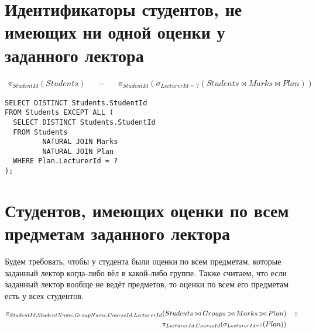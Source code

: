 \documentclass{article}
\def\ojoin{\setbox0=\hbox{$\bowtie$}%
  \rule[-.02ex]{.25em}{.4pt}\llap{\rule[\ht0]{.25em}{.4pt}}}
\def\leftouterjoin{\mathbin{\ojoin\mkern-5.8mu\bowtie}}
\begin{document}
	\section{Идентификаторы студентов, не имеющих ни одной оценки у заданного лектора}
	
	\begin{align*}
	\pi_{StudentId}(Students) &&- &&\pi_{StudentId}(\sigma_{LecturerId=?}(Students \bowtie Marks \bowtie Plan))
	\end{align*}
	
\begin{verbatim}
SELECT DISTINCT Students.StudentId
FROM Students EXCEPT ALL (
  SELECT DISTINCT Students.StudentId
  FROM Students
         NATURAL JOIN Marks
         NATURAL JOIN Plan
  WHERE Plan.LecturerId = ?
);
\end{verbatim}

\section{Студентов, имеющих оценки по всем предметам заданного лектора}

Будем требовать, чтобы у студента были оценки по всем предметам, которые заданный лектор когда-либо вёл в какой-либо группе.
Также считаем, что если заданный лектор вообще не ведёт предметов, то оценки по всем его предметам есть у всех студентов.

	\begin{align*}
	\pi_{StudentId, StudentName, GroupName, CourseId, LecturerId}(Students \bowtie Groups \leftouterjoin Marks \leftouterjoin Plan) && \div \\ \pi_{LecturerId, CourseId}(\sigma_{LecturerId = ?}(Plan) )
	\end{align*}
	
\end{document}
